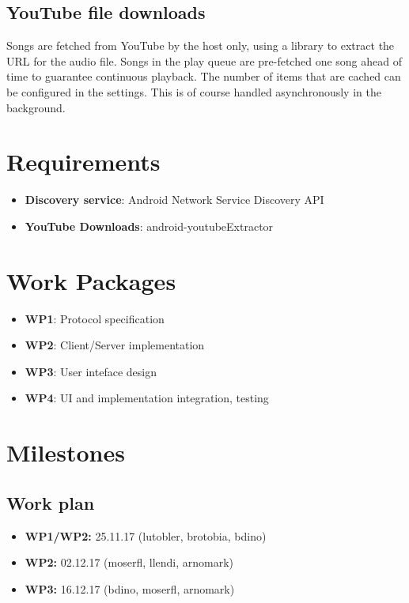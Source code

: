 \documentclass{report}
\begin{document}
\subsection{YouTube file downloads}
Songs are fetched from YouTube by the host only, using a library \cite{youtubeExtractor}
to extract the URL for the audio file. Songs in the play queue are pre-fetched
one song ahead of time to guarantee continuous playback. The number of items that 
are cached can be configured in the settings. This is of course handled asynchronously in
the background.

\section{Requirements}
\begin{itemize}
    \item {\bf Discovery service}: Android Network Service Discovery API \cite{nsd}
    \item {\bf YouTube Downloads}: android-youtubeExtractor \cite{youtubeExtractor}
\end{itemize}

\section{Work Packages}
\begin{itemize}
    \item {\bf WP1}: Protocol specification
    \item {\bf WP2}: Client/Server implementation
    \item {\bf WP3}: User inteface design
    \item {\bf WP4}: UI and implementation integration, testing
\end{itemize}

\section{Milestones}
\subsection*{Work plan}
\begin{itemize}
    \item {\bf WP1/WP2:} 25.11.17 (lutobler, brotobia, bdino)
    \item {\bf WP2:} 02.12.17 (moserfl, llendi, arnomark)
    \item {\bf WP3:} 16.12.17 (bdino, moserfl, arnomark)
\end{itemize}
\end{document}
